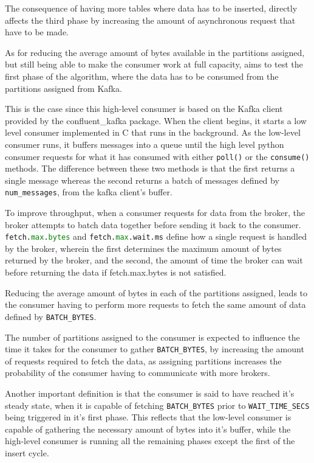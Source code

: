 The consequence of having more tables where data has to be inserted, directly affects the third phase by increasing the amount of asynchronous request that have to be made.

As for reducing the average amount of bytes available in the partitions assigned, but still being able to make the consumer work at full capacity, aims to test the first phase of the algorithm, where the data has to be consumed from the partitions assigned from Kafka.

This is the case since this high-level consumer is based on the Kafka client provided by the confluent\_kafka package. When the client begins, it starts a low level consumer implemented in C that runs in the background. As the low-level consumer runs, it buffers messages into a queue until the high level python consumer requests for what it has consumed with either \lstinline[language=Python]{poll()} or the \lstinline[language=Python]{consume()} methods. The difference between these two methods is that the first returns a single message whereas the second returns a batch of messages defined by \lstinline[language=Python]{num_messages}, from the kafka client's buffer. 

To improve throughput, when a consumer requests for data from the broker, the broker attempts to batch data together before sending it back to the consumer. \lstinline[language=Python]{fetch.max.bytes} and \lstinline[language=Python]{fetch.max.wait.ms} define how a single request is handled by the broker, wherein the first determines the maximum amount of bytes returned by the broker, and the second, the amount of time the broker can wait before returning the data if fetch.max.bytes is not satisfied.

Reducing the average amount of bytes in each of the partitions assigned, leads to the consumer having to perform more requests to fetch the same amount of data defined by \lstinline[language=Python]{BATCH_BYTES}. 

The number of partitions assigned to the consumer is expected to influence the time it takes for the consumer to gather \lstinline[language=Python]{BATCH_BYTES}, by increasing the amount of requests required to fetch the data, as assigning partitions increases the probability of the consumer having to communicate with more brokers. 

Another important definition is that the consumer is said to have reached it's steady state, when it is capable of fetching \lstinline[language=Python]{BATCH_BYTES} prior to \lstinline[language=Python]{WAIT_TIME_SECS} being triggered in it's first phase. This reflects that the low-level consumer is capable of gathering the necessary amount of bytes into it's buffer, while the high-level consumer is running all the remaining phases except the first of the insert cycle.

